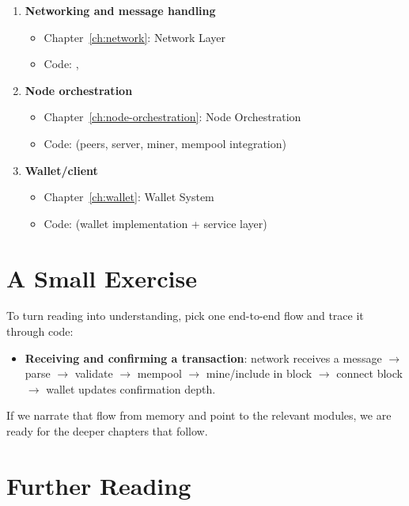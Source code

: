 \begin{enumerate}
  \item \textbf{Networking and message handling}
    \begin{itemize}
      \item Chapter~\ref{ch:network}: Network Layer
      \item Code: , 
    \end{itemize}

  \item \textbf{Node orchestration}
    \begin{itemize}
      \item Chapter~\ref{ch:node-orchestration}: Node Orchestration
      \item Code:  (peers, server, miner, mempool integration)
    \end{itemize}

  \item \textbf{Wallet/client}
    \begin{itemize}
      \item Chapter~\ref{ch:wallet}: Wallet System
      \item Code:  (wallet implementation + service layer)
    \end{itemize}
\end{enumerate}

\section{A Small Exercise}
\label{sec:ch05-exercise}

To turn reading into understanding, pick one end-to-end flow and trace it through code:

\begin{itemize}
  \item \textbf{Receiving and confirming a transaction}: network receives a  message \(\to\) parse \(\to\) validate \(\to\) mempool \(\to\) mine/include in block \(\to\) connect block \(\to\) wallet updates confirmation depth.
\end{itemize}

If we narrate that flow from memory and point to the relevant modules, we are ready for the deeper chapters that follow.

\section{Further Reading}
\label{sec:ch05-further-reading}

